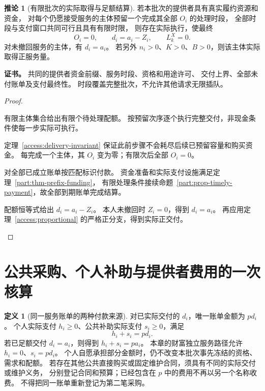 \documentclass[UTF8,12pt,a4paper,openany,fontset=none,zihao=false]{ctexrep}
\theoremstyle{definition}
\newtheorem{definition}{定义}[chapter]
\newtheorem{corollary}{推论}[chapter]
\newenvironment{certificate}{\par\noindent\textbf{证书。}\ignorespaces}{\par}
\newcommand{\1}{\mathbf 1}
\begin{document}
\begin{corollary}[有限批次的实际取得与足额结算]
\label{access:actual-delivery}
若本批次的提供者具有真实履约资源和资金，
对每个仍愿接受服务的主体预留一个完成其全部 \(O_i\) 的处理时段，
全部时段与支付窗口共同可行且具有有限时限，
则存在实际执行，使最终
\[
O_i=0,\qquad d_i=a_i-Z_i,\qquad L_k^X=0.
\]
对未撤回服务的主体，有 \(d_i=a_i\)。
若另外 \(n_i>0\)、\(K>0\)、\(B>0\)，则该主体实际取得正服务量。
\end{corollary}
\begin{certificate}
共同的提供者资金前缀、服务时段、资格和用途许可、
交付上界、全部未付账单及支付最终性。
时段覆盖完整批次，不允许其他请求无限插队。
\end{certificate}
\begin{proof}
\begin{semanticsteps}
\item 有限主体集合给出有限个待处理配额。
按预留次序逐个执行完整交付，非现金条件使每一步实际可执行。
\item 定理~\ref{access:delivery-invariant} 保证此前步骤不会耗尽后续已预留容量和购买资金。
每完成一个主体，其 \(O_i\) 变为零；有限次后全部 \(O_i=0\)。
\item 对全部已成立账单按匹配标识付款。
资金准备和实际支付设施满足定理~\ref{part:thm-prefix-funding}，
有限处理条件接续命题~\ref{part:prop-timely-payment}，故全部到期账单完成结算。
\item 配额恒等式给出 \(d_i=a_i-Z_i\)。
本人未撤回时 \(Z_i=0\)，得到 \(d_i=a_i\)。
再应用定理~\ref{access:proportional} 的严格正分支，得到实际正交付。
\end{semanticsteps}
\end{proof}

\section{公共采购、个人补助与提供者费用的一次核算}

\begin{definition}[同一服务账单的两种付款来源]
\label{access:invoice}
对已实际交付的 \(d_i\)，唯一账单金额为 \(pd_i\)。
个人实际支付 \(h_i\ge0\)、公共补助实际支付 \(s_i\ge0\)，满足
\[
h_i+s_i=pd_i.
\]
若已足额交付 \(d_i=a_i\)，则得到 \(h_i+s_i=pa_i\)。
本章的财富独立服务路径允许 \(h_i=0\)、\(s_i=pd_i\)。
个人自愿承担部分金额时，仍不改变本批次事先冻结的资格、需求和配额。
若存在其他公共直接购买或固定维护合同，须具有不同的实际交付或维护义务，
分别登记合同和预算；已经包含在 \(p\) 中的费用不再以另一个名称收费。
不得把同一账单重新登记为第二笔采购。
\end{definition}
\end{document}
